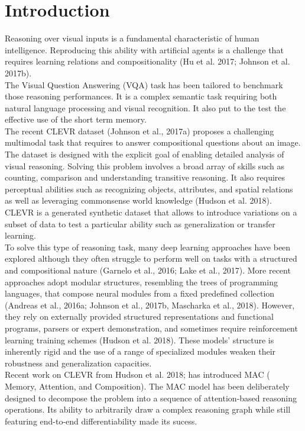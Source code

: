 \section{Introduction}
Reasoning over visual inputs is a fundamental characteristic of human intelligence.
Reproducing this ability with artificial agents is a challenge that requires learning relations and compositionality (Hu et al. 2017; Johnson et al. 2017b).\\
The Visual Question Answering (VQA) task has been tailored to benchmark those reasoning performances. It is a complex semantic task requiring both natural language processing and visual recognition. It also put to the test the effective use of the short term memory.\\
The recent CLEVR dataset (Johnson et al., 2017a) proposes a challenging multimodal task that requires to answer compositional questions about an image. The dataset is designed with the explicit goal of enabling detailed analysis of visual reasoning.
Solving this problem involves a broad array of skills such as counting, comparison and understanding transitive reasoning.
It also requires perceptual abilities such as recognizing objects, attributes, and spatial relations as well as leveraging commonsense world knowledge (Hudson et al. 2018).
CLEVR is a generated synthetic dataset that allows to introduce variations on a subset of data to test a particular ability such as generalization or transfer learning.\\
To solve this type of reasoning task, many deep learning approaches have been explored although they often struggle to perform well on tasks with a structured and compositional nature (Garnelo et al., 2016; Lake et al., 2017). 
More recent approaches adopt modular structures, resembling the trees of programming languages, that compose neural modules from a fixed predefined collection (Andreas et al., 2016a; Johnson et al., 2017b, Mascharka et al., 2018). However, they rely on externally provided structured representations and functional programs, parsers or expert demonstration, and sometimes require reinforcement learning training schemes (Hudson et al. 2018). 
These models’ structure is inherently rigid and the use of a range of specialized modules weaken their robustness and generalization capacities.\\
Recent work on CLEVR from Hudson et al. 2018;  has introduced  MAC ( Memory, Attention, and Composition). The MAC model has been deliberately designed to decompose the problem into a sequence of attention-based reasoning operations. Its ability to arbitrarily draw a complex reasoning graph while still featuring end-to-end differentiability made its sucess.
